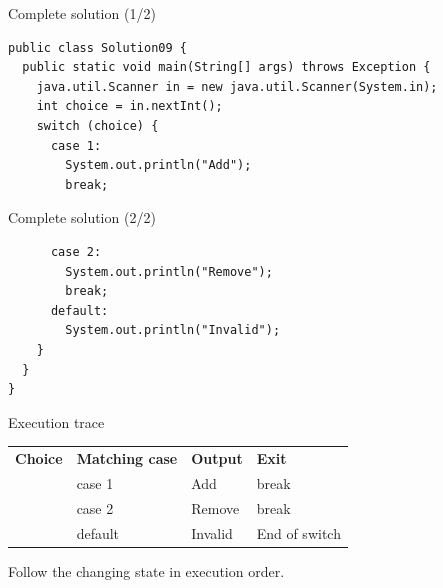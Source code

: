 \documentclass[10pt,aspectratio=169]{beamer}
\begin{document}
\begin{frame}[fragile,t]{Complete solution (1/2)}
\begin{lstlisting}
public class Solution09 {
  public static void main(String[] args) throws Exception {
    java.util.Scanner in = new java.util.Scanner(System.in);
    int choice = in.nextInt();
    switch (choice) {
      case 1:
        System.out.println("Add");
        break;
\end{lstlisting}
\end{frame}

\begin{frame}[fragile,t]{Complete solution (2/2)}
\begin{lstlisting}
      case 2:
        System.out.println("Remove");
        break;
      default:
        System.out.println("Invalid");
    }
  }
}
\end{lstlisting}
\end{frame}

\begin{frame}[fragile,t]{Execution trace}
\small\renewcommand{\arraystretch}{1.5}
\begin{tabularx}{\textwidth}{>{\raggedright\arraybackslash}X>{\raggedright\arraybackslash}X>{\raggedright\arraybackslash}X>{\raggedright\arraybackslash}X}
\rowcolor{navy}
\color{white}\bfseries Choice & \color{white}\bfseries Matching case & \color{white}\bfseries Output & \color{white}\bfseries Exit\\
1 & case 1 & Add & break\\
2 & case 2 & Remove & break\\
9 & default & Invalid & End of switch\\
\end{tabularx}
\vspace{3mm}\footnotesize Follow the changing state in execution order.
\end{frame}
\end{document}

